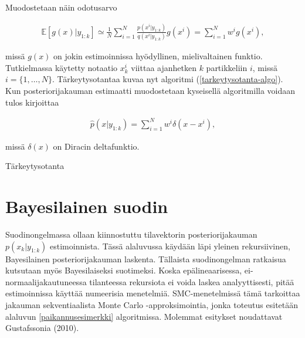 \documentclass[
  12pt,
  a4paper, twoside]{book}
\begin{document}
Muodostetaan näin odotusarvo

\begin{align}
\mathbb{E}[g(x)|y_{1:k}]\simeq\frac{1}{N}\sum_{i=1}^N\frac{p(x^i|y_{1:k})}{q(x^i|y_{1:k})}g(x^i)=\sum_{i=1}^Nw^ig(x^i),
\end{align}

\noindent missä \(g(x)\) on jokin estimoinnissa hyödyllinen, mielivaltainen funktio. Tutkielmassa käytetty notaatio \(x_k^i\) viittaa ajanhetken \(k\) partikkeliin \(i\), missä \(i=\{1,\ldots,N\}\). Tärkeytysotantaa kuvaa nyt algoritmi (\ref{tarkeytysotanta-algo}). Kun posteriorijakauman estimaatti muodostetaan kyseisellä algoritmilla voidaan tulos kirjoittaa

\begin{align}
\hat{p}(x|y_{1:k})=\sum_{i=1}^{N}w^i \delta(x-x^i),
\end{align}

\noindent missä \(\delta(x)\) on Diracin deltafunktio.

\begin{algorithm}[H]
\label{tarkeytysotanta-algo}
\DontPrintSemicolon
{}  
\caption{Tärkeytysotanta}
\end{algorithm}

\section{Bayesilainen suodin} \label{bayesilainen-suodin}

Suodinongelmassa ollaan kiinnostuttu tilavektorin posteriorijakauman \(p(x_k|y_{1:k})\) estimoinnista. Tässä alaluvussa käydään läpi yleinen rekursiivinen, Bayesilainen posteriorijakauman laskenta. Tällaista suodinongelman ratkaisua kutsutaan myös Bayesilaiseksi suotimeksi. Koska epälineaarisessa, ei-normaalijakautuneessa tilanteessa rekursiota ei voida laskea analyyttisesti, pitää estimoinnissa käyttää numeerisia menetelmiä. SMC-menetelmissä tämä tarkoittaa jakauman sekventiaalista Monte Carlo -approksimointia, jonka toteutus esitetään alaluvun \ref{paikannusesimerkki} algoritmissa. Molemmat esitykset noudattavat Gustafssonia (2010).
\end{document}
